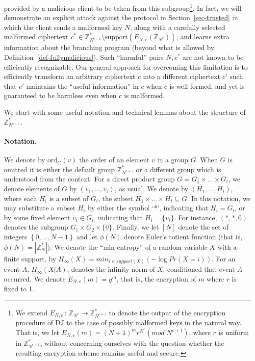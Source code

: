 \documentclass{article}
\newcommand{\order}{{\mathrm{ord}}}
\newcommand{\encdj}{{E}_{N,e}}
\newcommand{\encdjnr}{{\tilde{E}}_{N,e}}
\newcommand{\support}{{\mathrm{support}}}
\newcommand{\plain}{{{M}}}
\newcommand{\plaintext}[1]{\plain_{#1}}
\newcommand{\fnrngdom}[2]{#1\to#2}
\newcommand{\fndef}[3]{{#1\,:\,\fnrngdom{#2}{#3}}}
\newcommand{\set}[1]{\left\{#1\right\}}
\newcommand{\Z}{{\mathbb{Z}}}
\newcommand{\opbrange}[3][,]{#2#1\ldots#1#3}
\newcommand{\ot}{\mbox{OT}\;}
\newcommand{\U}[1]{\mathbb{Z}_{#1}^*}
\begin{document}
provided by a malicious client to be taken from this subgroup\footnote{We extend $\fndef{E_{N,e}}{\Z_{N^e}}{\Z^*_{N^{e+1}}}$ to denote
the output of the encryption procedure of DJ to the case of possibly malformed keys in the natural way. That is, we let $E_{N,e}(m)=(N+1)^mr^{N^e}(mod\;N^{e+1})$,
where $r$ is uniform in $\Z^*_{N^{e+1}}$, without concerning ourselves with the question whether the resulting encryption scheme remains useful and secure.}. In
fact, we will demonstrate an explicit attack against the protocol
in Section~\ref{sec-trusted} in which the client sends a malformed
key $N$, along with a carefully selected malformed ciphertext
$c^*\in \U{N^{e+1}}\setminus \support(\encdj(\Z_{N^e}))$, and
learns extra information about the branching program (beyond what
is allowed by Definition~\ref{def-fullymalicious}). Such
``harmful'' pairs $N,c^*$ are not known to be efficiently
recognizable. Our general approach for overcoming this limitation
is to efficiently transform an arbitrary ciphertext $c$ into a
different ciphertext $c'$ such that $c'$ maintains the ``useful
information'' in $c$ when $c$ is well formed, and yet is guaranteed
to be harmless even when $c$ is malformed.

\medskip

We start with some useful notation and technical lemmas about the structure of
$\U{N^{e+1}}$.

\paragraph{Notation.} We denote by $\order_G(v)$ the order of an
element $v$ in a group $G$. When $G$ is omitted it is either the
default group $\U{N^{e+1}}$ or a different group which is
understood from the context. For a direct product group
$G=\opbrange[\times]{G_1}{G_t}$, we denote elements of $G$ by
$(\opbrange{v_1}{v_t})$, as usual.
We denote by $(\opbrange{H_1}{H_t})$, where each
$H_i$ is a subset of $G_i$, the subset
$\opbrange[\times]{H_1}{H_t}\subseteq G$. In this notation, we may
substitute a subset $H_i$ by either the symbol `*', indicating that
$H_i=G_i$, or by some fixed element $v_i\in G_i$, indicating that
$H_i=\{v_i\}$. For instance, $(*,*,0)$ denotes the subgroup
$G_1\times G_2\times \{0\}$. Finally, we let $[N]$ denote the set
of integers $\set{\opbrange{0}{N-1}}$ and let $\phi(N)$ denote
Euler's totient function (that is, $\phi(N)=|\U{N}|$). We denote the ``min-entropy''
of a random variable $X$ with a finite support, by $H_\infty(X)=min_{i\in support(X)}(-\log{Pr(X=i)})$.
For an event $A$, $H_\infty(X|A)$, denotes the infinity norm of $X$, conditioned that event $A$ occurred.
We denote $\encdjnr(m)=g^m$, that is, the encryption of $m$ where $r$ is fixed to 1.
\end{document}
